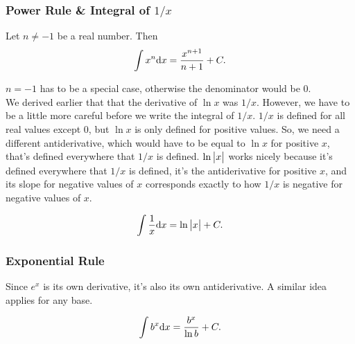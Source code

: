 \subsubsection{Power Rule \& Integral of $1/x$}
\begin{lemma}
	Let $n \neq -1$ be a real number.
	Then
	\begin{equation*}
		\int{x^n \mathrm{d} x} = \frac{x^{n+1}}{n+1} + C.
	\end{equation*}
\end{lemma}


$n = -1$ has to be a special case, otherwise the denominator would be 0. \\


We derived earlier that that the derivative of $\ln{x}$ was $1/x$.
However, we have to be a little more careful before we write the integral of $1/x$.
$1/x$ is defined for all real values except 0, but $\ln{x}$ is only defined for positive values.
So, we need a different antiderivative, which would have to be equal to $\ln{x}$ for positive $x$, that's defined everywhere that $1/x$ is defined.
$\ln{\big\lvert x \big\rvert}$ works nicely because it's defined everywhere that $1/x$ is defined, it's the antiderivative for positive $x$, and its slope for negative values of $x$ corresponds exactly to how $1/x$ is negative for negative values of $x$.
\begin{lemma}
	\begin{equation*}
		\int{\frac{1}{x}\mathrm{d} x} = \ln{\big\lvert x \big\rvert} + C.
	\end{equation*}
\end{lemma}

\subsubsection{Exponential Rule}
Since $e^x$ is its own derivative, it's also its own antiderivative.
A similar idea applies for any base.
\begin{lemma}
	\begin{equation*}
		\int{b^x\mathrm{d} x} = \frac{b^x}{\ln{b}} + C.
	\end{equation*}
\end{lemma}



